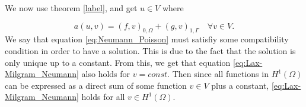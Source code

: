 We now use theorem \ref{label}, and get $u\in V$ where

\begin{equation}\label{eq:Lax-Milgram_Neumann}
  a(u,v) = (f,v)_{0,\Omega} + (g,v)_{1,\Gamma} \quad \forall v\in V.  
\end{equation}
We say that equation \ref{eq:Neumann_Poisson} must satisfiy some compatibility condition in order to have a solution. This is due to the fact that the solution is only unique up to a constant. From this, we get that equation \ref{eq:Lax-Milgram_Neumann} also holds for $v=const$.
Then since all functions in $H^1(\Omega)$ can be expressed as a direct sum of some function $v\in V$ plus a constant, \ref{eq:Lax-Milgram_Neumann} holds for all $v\in H^1(\Omega)$.
